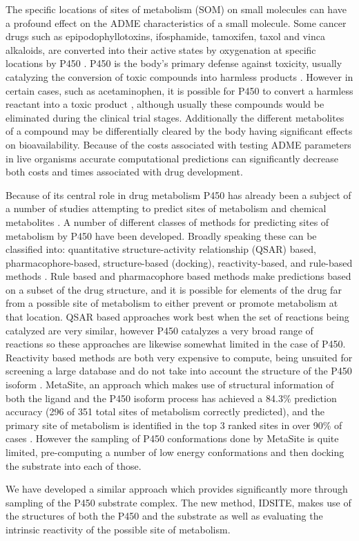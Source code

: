 The specific locations of sites of metabolism (SOM) on small molecules can have a profound effect on the ADME characteristics of a small molecule.
Some cancer drugs such as epipodophyllotoxins, ifosphamide, tamoxifen, taxol and vinca alkaloids, are converted into their active states by oxygenation at specific locations by P450 \cite{kivisto1995role}.
P450 is the body's primary defense against toxicity, usually catalyzing the conversion of toxic compounds into harmless products \cite{gonzalez2005role,guengerich2001common}.
However in certain cases, such as acetaminophen, it is possible for P450 to convert a harmless reactant into a toxic product \cite{chen1998oxidation}, although usually these compounds would be eliminated during the clinical trial stages.
Additionally the different metabolites of a compound may be differentially cleared by the body having significant effects on bioavailability.
Because of the costs associated with testing ADME parameters in live organisms accurate computational predictions can significantly decrease both costs and times associated with drug development.

Because of its central role in drug metabolism P450 has already been a subject of a number of studies attempting to predict sites of metabolism and chemical metabolites \cite{afzelius2007state}.
A number of different classes of methods for predicting sites of metabolism by P450 have been developed.
Broadly speaking these can be classified into: quantitative structure-activity relationship (QSAR) based, pharmacophore-based, structure-based (docking), reactivity-based, and rule-based methods \cite{cruciani2005metasite}.
Rule based and pharmacophore based methods make predictions based on a subset of the drug structure, and it is possible for elements of the drug far from a possible site of metabolism to either prevent or promote metabolism at that location.
QSAR based approaches work best when the set of reactions being catalyzed are very similar, however P450 catalyzes a very broad range of reactions so these approaches are likewise somewhat limited in the case of P450.
Reactivity based methods are both very expensive to compute, being unsuited for screening a large database and do not take into account the structure of the P450 isoform \cite{singh2003model,chen1997oxidative,de2002factors}.
MetaSite, an approach which makes use of structural information of both the ligand and the P450 isoform process has achieved a 84.3\% prediction accuracy (296 of 351 total sites of metabolism correctly predicted), and the primary site of metabolism is identified in the top 3 ranked sites in over 90\% of cases \cite{cruciani2005metasite}.
However the sampling of P450 conformations done by MetaSite is quite limited, pre-computing a number of low energy conformations and then docking the substrate into each of those.

We have developed a similar approach which provides significantly more through sampling of the P450 substrate complex.
The new method, IDSITE, makes use of the structures of both the P450 and the substrate as well as evaluating the intrinsic reactivity of the possible site of metabolism. 
